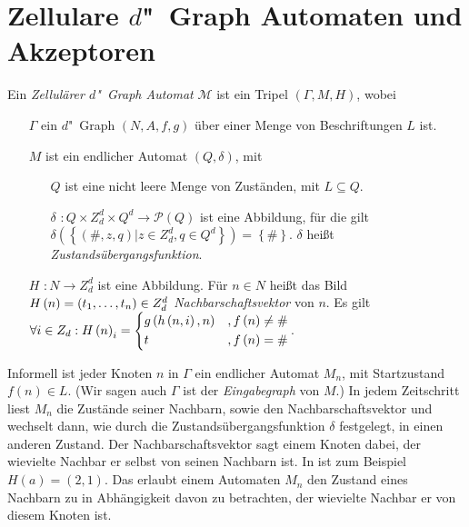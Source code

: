 \documentclass[11pt]{article}
\newcommand{\defWord}[1]{\emph{#1}}
\begin{document}
\section{Zellulare $d$"~Graph Automaten und Akzeptoren}

\begin{definition}
	Ein \defWord{Zellulärer $d$"~Graph Automat} $\mathcal{M}$ ist ein Tripel $\left(\Gamma, M, H\right)$, wobei
	\begin{itemize}
		\item[$\Gamma$] ein $d$"~Graph $\left(N, A, f, g\right)$ über einer Menge von Beschriftungen $L$ ist.
		\item[$M$]  ist ein endlicher Automat $\left(Q, \delta\right)$, mit 
		\begin{itemize}
			\item[$Q$] ist eine nicht leere Menge von Zuständen, mit $L \subseteq Q$.
			\item[$\delta$] $: Q \times Z_d^d \times Q^d \rightarrow \mathcal{P}\left(Q\right)$ ist eine Abbildung, für die gilt $\delta \left(\left \{\left(\#, z, q\right) \vert z \in Z_d^d, q \in Q^d\right \}\right) = \left \{\# \right \}$. $\delta$ heißt \defWord{Zustandsübergangsfunktion}.
		\end{itemize}
		\item[$H$] $: N \rightarrow Z_d^d$ ist eine Abbildung. 
		Für $n \in N$ heißt das Bild $H \left(n\right) = \left(t_1, \text{\dots}, t_n\right) \in Z_d^d$ \defWord{Nachbarschaftsvektor} von $n$. Es gilt $\forall i \in Z_d : H\left(n\right)_i = \begin{dcases}
		g\left(h\left(n, i\right), n\right) & ,f\left(n\right) \neq \# \\
		t & , f\left(n\right) = \# \\
		\end{dcases}$.
	\end{itemize}
\end{definition}

Informell ist jeder Knoten $n$ in $\Gamma$ ein endlicher Automat $M_n$, mit Startzustand $f\left(n\right) \in L$. 
(Wir sagen auch $\Gamma$ ist der \defWord{Eingabegraph} von $M$.) 
In jedem Zeitschritt liest $M_n$ die Zustände seiner Nachbarn, sowie den Nachbarschaftsvektor und wechselt dann, wie durch die Zustandsübergangsfunktion $\delta$ festgelegt, in einen anderen Zustand. 
Der Nachbarschaftsvektor sagt einem Knoten dabei, der wievielte Nachbar er selbst von seinen Nachbarn ist. 
In  ist zum Beispiel $H\left(a\right) = \left(2, 1\right)$. 
Das erlaubt einem Automaten $M_n$ den Zustand eines Nachbarn zu in Abhängigkeit davon zu betrachten, der wievielte Nachbar er von diesem Knoten ist.
\end{document}
